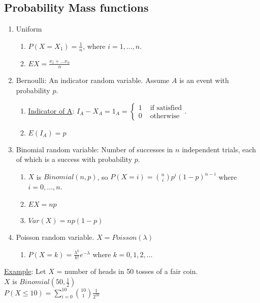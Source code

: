   \subsection*{Probability Mass functions}
    \begin{enumerate}
      \item Uniform
      \begin{enumerate}
        \item $P(X = X_1) = \frac{1}{n}$, where $i = 1, \ldots, n$. 
        \item $EX = \frac{x_1 + \ldots x_n}{n}$
      \end{enumerate}
      \item Bernoulli: An indicator random variable. Assume $A$ is an event with
        probability $p$. 
      \begin{enumerate}
        \item \underline{Indicator of A}: $I_A - X_A = 1_A =  
          \begin{cases} 1 & \text{ if satisfied}\\ 0 & \text{ otherwise}
          \end{cases}$. 
        \item $E(I_A) = p$
      \end{enumerate}
      \item Binomial random variable: Number of successes in $n$ independent
        trials, each of which is a success with probability $p$.
      \begin{enumerate}
        \item $X$ is $Binomial(n,p)$, so $P(X=i) = \binom{n}{i}p^i(1-p)^{n-i}$
          where $i = 0, \ldots, n$.
        \item $EX = np$
        \item $Var(X) = np(1-p)$
      \end{enumerate}
      \item Poisson random variable. $X = Poisson(\lambda)$
      \begin{enumerate}
        \item $P(X = k) = \frac{\lambda^k}{k!} e^{-\lambda}$ where $k = 0, 1, 2,
        \ldots$
      \end{enumerate}
    \end{enumerate}
    \underline{Example}: Let $X$ = number of heads in 50 tosses of a fair 
    coin.\\
    $X$ is $Binomial(50, \frac{1}{2})$\\
    $P(X \le 10) = \sum_{i = 0}^{10} \binom{10}{1} \frac{1}{2^{50}}$\\\\
